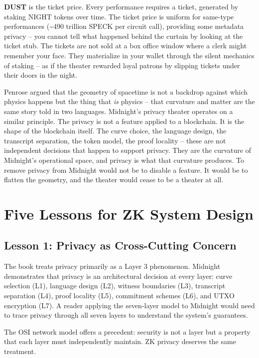 \documentclass[
  11pt,
  openany]{report}
\renewcommand{\textbf}[1]{{\bfseries\color{MidnightBold}#1}}
\begin{document}
\textbf{DUST} is the ticket price. Every performance requires a ticket,
generated by staking NIGHT tokens over time. The ticket price is uniform for
same-type performances (\textasciitilde490 trillion SPECK per circuit call),
providing some metadata privacy -- you cannot tell what happened behind the
curtain by looking at the ticket stub. The tickets are not sold at a box office
window where a clerk might remember your face. They materialize in your wallet
through the silent mechanics of staking -- as if the theater rewarded loyal
patrons by slipping tickets under their doors in the night.

Penrose argued that the geometry of spacetime is not a backdrop against which
physics happens but the thing that \emph{is} physics -- that curvature and
matter are the same story told in two languages. Midnight's privacy theater
operates on a similar principle. The privacy is not a feature applied to a
blockchain. It is the shape of the blockchain itself. The curve choice, the
language design, the transcript separation, the token model, the proof locality
-- these are not independent decisions that happen to support privacy. They are
the curvature of Midnight's operational space, and privacy is what that
curvature produces. To remove privacy from Midnight would not be to disable a
feature. It would be to flatten the geometry, and the theater would cease to be
a theater at all.

\section{Five Lessons for ZK System
Design}\label{five-lessons-for-zk-system-design}

\subsection{Lesson 1: Privacy as Cross-Cutting
Concern}\label{lesson-1-privacy-as-cross-cutting-concern}

The book treats privacy primarily as a Layer 3 phenomenon. Midnight demonstrates
that privacy is an architectural decision at every layer: curve selection (L1),
language design (L2), witness boundaries (L3), transcript separation (L4), proof
locality (L5), commitment schemes (L6), and UTXO encryption (L7). A reader
applying the seven-layer model to Midnight would need to trace privacy through
all seven layers to understand the system's guarantees.

The OSI network model offers a precedent: security is not a layer but a property
that each layer must independently maintain. ZK privacy deserves the same
treatment.
\end{document}
